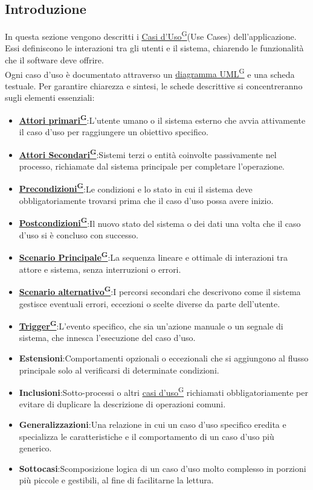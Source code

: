 ﻿\documentclass[a4paper,12pt]{article}
\providecommand{\glslink}[2]{\href{https://alittlebyte-19.github.io/Documentazione/glossario.html\#gls-#1}{\underline{#2}\textsuperscript{\scriptsize G}}}
\begin{document}
\subsection{Introduzione}
In questa sezione vengono descritti i \glslink{caso-d-uso-uc}{Casi d'Uso}(Use Cases) dell'applicazione. Essi definiscono le interazioni tra gli utenti e il sistema, chiarendo le funzionalità che il software deve offrire.\\
Ogni caso d'uso è documentato attraverso un \glslink{diagramma-delle-classi-uml}{diagramma UML} e una scheda testuale. Per garantire chiarezza e sintesi, le schede descrittive si concentreranno sugli elementi essenziali:
\begin{itemize}
    \item \textbf{\glslink{attore-primario}{Attori primari}}:L'utente umano o il sistema esterno che avvia attivamente il caso d'uso per raggiungere un obiettivo specifico.
    \item \textbf{\glslink{attore-secondario}{Attori Secondari}}:Sistemi terzi o entità coinvolte passivamente nel processo, richiamate dal sistema principale per completare l'operazione.
    \item \textbf{\glslink{precondizioni}{Precondizioni}}:Le condizioni e lo stato in cui il sistema deve obbligatoriamente trovarsi prima che il caso d'uso possa avere inizio.
    \item \textbf{\glslink{postcondizioni}{Postcondizioni}}:Il nuovo stato del sistema o dei dati una volta che il caso d'uso si è concluso con successo.
    \item \textbf{\glslink{scenario-principale}{Scenario Principale}}:La sequenza lineare e ottimale di interazioni tra attore e sistema, senza interruzioni o errori.
    \item \textbf{\glslink{scenario-alternativo}{Scenario alternativo}}:I percorsi secondari che descrivono come il sistema gestisce eventuali errori, eccezioni o scelte diverse da parte dell'utente.
    \item \textbf{\glslink{trigger}{Trigger}}:L'evento specifico, che sia un'azione manuale o un segnale di sistema, che innesca l'esecuzione del caso d'uso.
    \item \textbf{Estensioni}:Comportamenti opzionali o eccezionali che si aggiungono al flusso principale solo al verificarsi di determinate condizioni.
    \item \textbf{Inclusioni}:Sotto-processi o altri \glslink{caso-d-uso-uc}{casi d'uso} richiamati obbligatoriamente per evitare di duplicare la descrizione di operazioni comuni.
    \item \textbf{Generalizzazioni}:Una relazione in cui un caso d'uso specifico eredita e specializza le caratteristiche e il comportamento di un caso d'uso più generico.
    \item \textbf{Sottocasi}:Scomposizione logica di un caso d'uso molto complesso in porzioni più piccole e gestibili, al fine di facilitarne la lettura.
\end{itemize}
\end{document}
